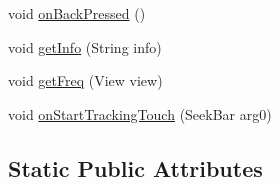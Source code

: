 \begin{DoxyCompactItemize}
\item 
void \hyperlink{classcom_1_1example_1_1android_1_1_bluetooth_chat_1_1_l_a_s_a_r_control_acb776333595cb036bf935852041cb088}{on\-Back\-Pressed} ()
\item 
void \hyperlink{classcom_1_1example_1_1android_1_1_bluetooth_chat_1_1_l_a_s_a_r_control_a3d586a7ab265876564fc5c288cb38e0d}{get\-Info} (String info)
\item 
void \hyperlink{classcom_1_1example_1_1android_1_1_bluetooth_chat_1_1_l_a_s_a_r_control_adc846b4b8d9a9ee1e53b348432eb8aff}{get\-Freq} (View view)
\item 
void \hyperlink{classcom_1_1example_1_1android_1_1_bluetooth_chat_1_1_l_a_s_a_r_control_a281a2ae677c641ec8d556d283435bd40}{on\-Start\-Tracking\-Touch} (Seek\-Bar arg0)
\end{DoxyCompactItemize}
\subsection*{Static Public Attributes}
